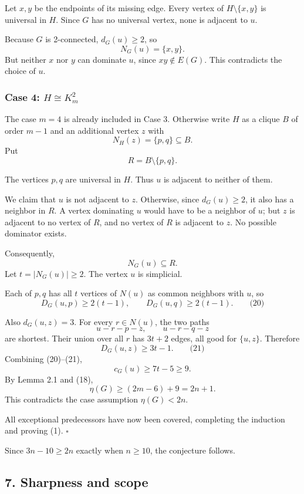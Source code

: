 \documentclass[
  11pt,
  a4paper,
]{article}
\newcounter{none} %
\begin{document}
Let \(x,y\) be the endpoints of its missing edge. Every vertex of
\(H\setminus\{x,y\}\) is universal in \(H\). Since \(G\) has no
universal vertex, none is adjacent to \(u\).

Because \(G\) is 2-connected, \(d_G(u)\ge2\), so \[
N_G(u)=\{x,y\}.
\] But neither \(x\) nor \(y\) can dominate \(u\), since
\(xy\notin E(G)\). This contradicts the choice of \(u\).

\subsubsection{\texorpdfstring{Case 4:
\(H\cong K_m^2\)}{Case 4: H\textbackslash cong K\_m\^{}2}}\label{case-4-hcong-k_m2}

The case \(m=4\) is already included in Case 3. Otherwise write \(H\) as
a clique \(B\) of order \(m-1\) and an additional vertex \(z\) with \[
N_H(z)=\{p,q\}\subseteq B.
\] Put \[
R=B\setminus\{p,q\}.
\]

The vertices \(p,q\) are universal in \(H\). Thus \(u\) is adjacent to
neither of them.

We claim that \(u\) is not adjacent to \(z\). Otherwise, since
\(d_G(u)\ge2\), it also has a neighbor in \(R\). A vertex dominating
\(u\) would have to be a neighbor of \(u\); but \(z\) is adjacent to no
vertex of \(R\), and no vertex of \(R\) is adjacent to \(z\). No
possible dominator exists.

Consequently, \[
N_G(u)\subseteq R.
\] Let \(t=|N_G(u)|\ge2\). The vertex \(u\) is simplicial.

Each of \(p,q\) has all \(t\) vertices of \(N(u)\) as common neighbors
with \(u\), so \[
D_G(u,p)\ge2(t-1),
\qquad
D_G(u,q)\ge2(t-1).
\qquad\text{(20)}
\]

Also \(d_G(u,z)=3\). For every \(r\in N(u)\), the two paths \[
u-r-p-z,\qquad u-r-q-z
\] are shortest. Their union over all \(r\) has \(3t+2\) edges, all good
for \(\{u,z\}\). Therefore \[
D_G(u,z)\ge3t-1.
\qquad\text{(21)}
\] Combining (20)--(21), \[
c_G(u)\ge7t-5\ge9.
\] By Lemma 2.1 and (18), \[
\eta(G)\ge(2m-6)+9=2n+1.
\] This contradicts the case assumption \(\eta(G)<2n\).

All exceptional predecessors have now been covered, completing the
induction and proving (1). \(\square\)

Since \(3n-10\ge2n\) exactly when \(n\ge10\), the conjecture follows.

\subsection{7. Sharpness and scope}\label{sharpness-and-scope}
\end{document}
